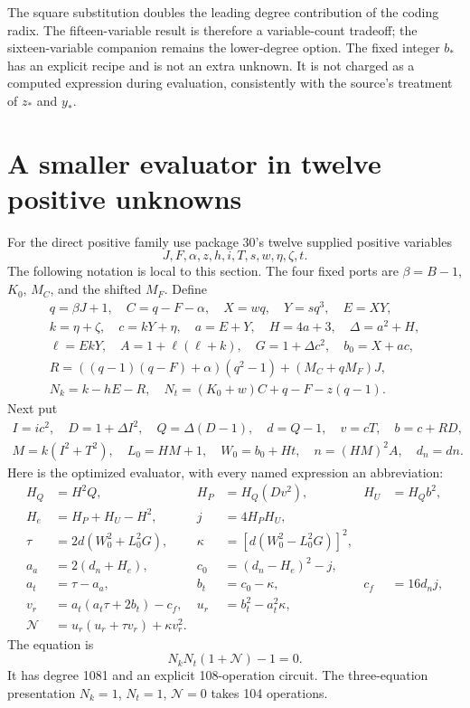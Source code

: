\documentclass[11pt]{article}
\theoremstyle{definition}\newtheorem{definition}[theorem]{Definition}
\begin{document}
The square substitution doubles the leading degree contribution of the coding radix. The fifteen-variable result is therefore a variable-count tradeoff; the sixteen-variable companion remains the lower-degree option. The fixed integer $b_*$ has an explicit recipe and is not an extra unknown. It is not charged as a computed expression during evaluation, consistently with the source's treatment of $z_*$ and $y_*$.

\section{A smaller evaluator in twelve positive unknowns}\label{sec:positive}
For the direct positive family use package 30's twelve supplied positive variables
\[
 J,F,\alpha,z,h,i,T,s,w,\eta,\zeta,t.
\]
The following notation is local to this section. The four fixed ports are $\beta=B-1$, $K_0$, $M_C$, and the shifted $M_F$. Define
\begin{gather*}
 q=\beta J+1,\quad C=q-F-\alpha,\quad X=wq,\quad Y=sq^3,\quad E=XY,\\
 k=\eta+\zeta,\quad c=kY+\eta,\quad a=E+Y,\quad H=4a+3,\quad\Delta=a^2+H,\\
 \ell=EkY,\quad A=1+\ell(\ell+k),\quad G=1+\Delta c^2,\quad b_0=X+ac,\\
 R=((q-1)(q-F)+\alpha)(q^2-1)+(M_C+qM_F)J,\\
 N_k=k-hE-R,\quad N_t=(K_0+w)C+q-F-z(q-1).
\end{gather*}
Next put
\begin{gather*}
 I=ic^2,\quad D=1+\Delta I^2,\quad Q=\Delta(D-1),\quad d=Q-1,
 \quad v=cT,\quad b=c+RD,\\
 M=k(I^2+T^2),\quad L_0=HM+1,\quad W_0=b_0+Ht,\quad n=(HM)^2A,
 \quad d_n=dn.
\end{gather*}
Here is the optimized evaluator, with every named expression an abbreviation:
\begin{align*}
 H_Q&=H^2Q,&H_P&=H_Q(Dv^2),&H_U&=H_Qb^2,\\
 H_e&=H_P+H_U-H^2,&j&=4H_PH_U,\\
 \tau&=2d(W_0^2+L_0^2G),&\kappa&=[d(W_0^2-L_0^2G)]^2,\\
 a_a&=2(d_n+H_e),&c_0&=(d_n-H_e)^2-j,\\
 a_t&=\tau-a_a,&b_t&=c_0-\kappa,&c_f&=16d_nj,\\
 v_r&=a_t(a_t\tau+2b_t)-c_f,&u_r&=b_t^2-a_t^2\kappa,\\
 \mathcal N&=u_r(u_r+\tau v_r)+\kappa v_r^2.
\end{align*}
The equation is
\begin{equation}\label{eq:positive12}
 \boxed{N_kN_t(1+\mathcal N)-1=0.}
\end{equation}
It has degree 1081 and an explicit 108-operation circuit. The three-equation presentation $N_k=1$, $N_t=1$, $\mathcal N=0$ takes 104 operations.
\end{document}

